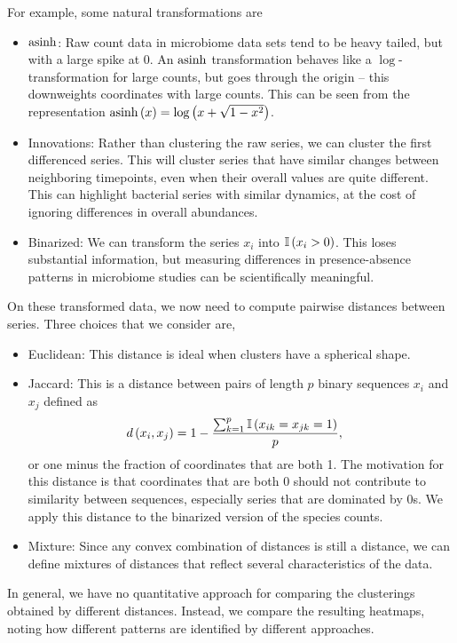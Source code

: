 \documentclass[14pt]{extreport}
\begin{document}
For example, some natural transformations are
\begin{itemize}
\item $\mathop\mathrm{asinh}$: Raw count data in microbiome data sets tend to
  be heavy tailed, but with a large spike at 0. An $\mathop\mathrm{asinh}$ transformation
  behaves like a $\log$-transformation for large counts, but goes through the
  origin -- this downweights coordinates with large counts. This can be seen
  from the representation $\mathop\mathrm{asinh}\left(x\right) = \log\left(x + \sqrt{1 -
      x^{2}}\right)$.
\item Innovations: Rather than clustering the raw series, we can cluster the
  first differenced series. This will cluster series that have similar changes between
  neighboring timepoints, even when their overall values are quite different. This
  can highlight bacterial series with similar dynamics, at the cost of ignoring
  differences in overall abundances.
\item Binarized: We can transform the series $x_{i}$ into $\mathbb{I}\left({x_{i} > 0}\right)$.
  This loses substantial information, but measuring differences in
  presence-absence patterns in microbiome studies can be scientifically
  meaningful.
\end{itemize}

On these transformed data, we now need to compute pairwise distances between
series. Three choices that we consider are,
\begin{itemize}
\item Euclidean: This distance is ideal when clusters have a spherical shape.
\item Jaccard: This is a distance between pairs of length $p$ binary sequences
  $x_{i}$ and $x_{j}$ defined as
\begin{align*}
  d\left(x_{i}, x_{j}\right) &= 1 - \frac{\sum_{k = 1}^{p} \mathbb{I}\left({x_{ik} = x_{jk} = 1}\right)}{p},
\end{align*}
or one minus the fraction of coordinates that are both 1. The motivation for this
distance is that coordinates that are both 0 should not contribute to similarity
between sequences, especially series that are dominated by 0s. We apply this
distance to the binarized version of the species counts.
\item Mixture: Since any convex combination of distances is still a distance, we
  can define mixtures of distances that reflect several characteristics of the
  data.
\end{itemize}

In general, we have no quantitative approach for comparing the clusterings
obtained by different distances. Instead, we compare the resulting heatmaps,
noting how different patterns are identified by different approaches.
\end{document}
